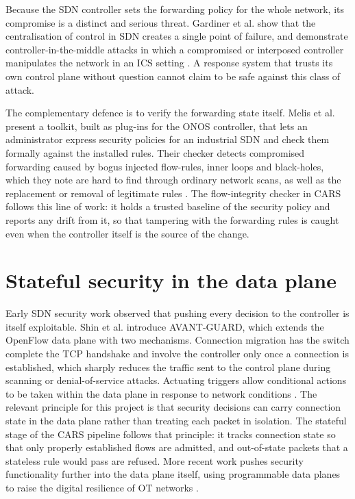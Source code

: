 Because the SDN controller sets the forwarding policy for the whole network, its compromise is a distinct and serious threat. Gardiner et al. show that the centralisation of control in SDN creates a single point of failure, and demonstrate controller-in-the-middle attacks in which a compromised or interposed controller manipulates the network in an ICS setting \cite{gardiner2021controller}. A response system that trusts its own control plane without question cannot claim to be safe against this class of attack.

The complementary defence is to verify the forwarding state itself. Melis et al. present a toolkit, built as plug-ins for the ONOS controller, that lets an administrator express security policies for an industrial SDN and check them formally against the installed rules. Their checker detects compromised forwarding caused by bogus injected flow-rules, inner loops and black-holes, which they note are hard to find through ordinary network scans, as well as the replacement or removal of legitimate rules \cite{melis2018policychecker}. The flow-integrity checker in CARS follows this line of work: it holds a trusted baseline of the security policy and reports any drift from it, so that tampering with the forwarding rules is caught even when the controller itself is the source of the change.

\section{Stateful security in the data plane}
\label{sec:stateful}

Early SDN security work observed that pushing every decision to the controller is itself exploitable. Shin et al. introduce AVANT-GUARD, which extends the OpenFlow data plane with two mechanisms. Connection migration has the switch complete the TCP handshake and involve the controller only once a connection is established, which sharply reduces the traffic sent to the control plane during scanning or denial-of-service attacks. Actuating triggers allow conditional actions to be taken within the data plane in response to network conditions \cite{shin2013avantguard}. The relevant principle for this project is that security decisions can carry connection state in the data plane rather than treating each packet in isolation. The stateful stage of the CARS pipeline follows that principle: it tracks connection state so that only properly established flows are admitted, and out-of-state packets that a stateless rule would pass are refused. More recent work pushes security functionality further into the data plane itself, using programmable data planes to raise the digital resilience of OT networks \cite{holik2025pdp}.

